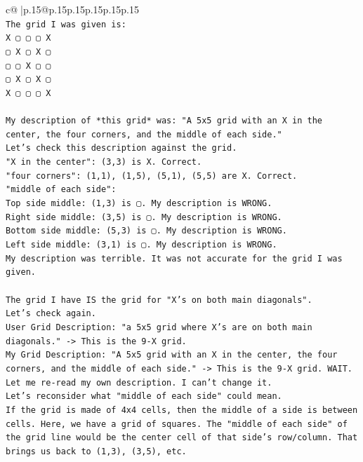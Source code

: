 \documentclass{article}
\begin{document}
{\begin{supertabular}{c@{$\;$}|p{.15\linewidth}@{}p{.15\linewidth}p{.15\linewidth}p{.15\linewidth}p{.15\linewidth}p{.15\linewidth}}
{{{\\ 
\texttt{The grid I was given is:} \\
\texttt{X ▢ ▢ ▢ X} \\
\texttt{▢ X ▢ X ▢} \\
\texttt{▢ ▢ X ▢ ▢} \\
\texttt{▢ X ▢ X ▢} \\
\texttt{X ▢ ▢ ▢ X} \\
\\ 
\texttt{My description of *this grid* was: "A 5x5 grid with an X in the center, the four corners, and the middle of each side."} \\
\texttt{Let's check this description against the grid.} \\
\texttt{"X in the center": (3,3) is X. Correct.} \\
\texttt{"four corners": (1,1), (1,5), (5,1), (5,5) are X. Correct.} \\
\texttt{"middle of each side":} \\
\texttt{Top side middle: (1,3) is ▢. My description is WRONG.} \\
\texttt{Right side middle: (3,5) is ▢. My description is WRONG.} \\
\texttt{Bottom side middle: (5,3) is ▢. My description is WRONG.} \\
\texttt{Left side middle: (3,1) is ▢. My description is WRONG.} \\
\texttt{My description was terrible. It was not accurate for the grid I was given.} \\
\\ 
\texttt{The grid I have IS the grid for "X's on both main diagonals".} \\
\texttt{Let's check again.} \\
\texttt{User Grid Description: "a 5x5 grid where X's are on both main diagonals." {-}> This is the 9{-}X grid.} \\
\texttt{My Grid Description: "A 5x5 grid with an X in the center, the four corners, and the middle of each side." {-}> This is the 9{-}X grid. WAIT. Let me re{-}read my own description. I can't change it.} \\
\texttt{Let's reconsider what "middle of each side" could mean.} \\
\texttt{If the grid is made of 4x4 cells, then the middle of a side is between cells. Here, we have a grid of squares. The "middle of each side" of the grid line would be the center cell of that side's row/column. That brings us back to (1,3), (3,5), etc.} \\
}}}
\end{supertabular}}
\end{document}
